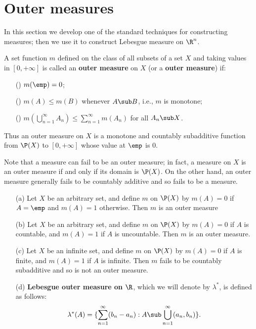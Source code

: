 \section{Outer measures}
In this section we develop one of the standard techniques for constructing measures; then we use it to construct Lebesgue measure on $\R^n$.
\begin{definition}
A set function $m$ defined on the class of all subsets of a set $X$ and taking values in $[0,+\infty]$ is called an \textbf{outer measure} on $X$ (or a \textbf{outer measure}) if:
\begin{itemize}
\item[(\rmnum{1})] $m(\emp)=0$;
\item[(\rmnum{2})] $m(A)\leq m(B)$ whenever $A\sub B$, i.e., $m$ is monotone;
\item[(\rmnum{3})] $m(\bigcup_{n=1}^{\infty}A_n)\leq\sum_{n=1}^{\infty}m(A_n)$ for all $A_n\sub X$.
\end{itemize}
\end{definition}
Thus an outer measure on $X$ is a monotone and countably subadditive function from $\P(X)$ to $[0,+\infty]$ whose value at $\emp$ is $0$.\par
Note that a measure can fail to be an outer measure; in fact, a measure on $X$ is an outer measure if and only if its domain is $\P(X)$. On the other hand, an outer measure generally fails to be countably additive and so fails to be a measure.
\begin{example}
\mbox{}
\begin{itemize}
\item[(a)] Let $X$ be an arbitrary set, and define $m$ on $\P(X)$ by $m(A)=0$ if $A=\emp$ and $m(A)=1$ otherwise. Then $m$ is an outer measure
\item[(b)] Let $X$ be an arbitrary set, and define $m$ on $\P(X)$ by $m(A)=0$ if $A$ is countable, and $m(A)=1$ if $A$ is uncountable. Then $m$ is an outer measure.
\item[(c)] Let $X$ be an infinite set, and define $m$ on $\P(X)$ by $m(A)=0$ if $A$ is finite, and $m(A)=1$ if $A$ is infinite. Then $m$ fails to be countably subadditive and so is not an outer measure.
\item[(d)] \textbf{Lebesgue outer measure on $\R$}, which we will denote by $\lambda^*$, is defined as follows:
\[\lambda^*(A)=\{\sum_{n=1}^{\infty}(b_n-a_n):A\sub\bigcup_{n=1}^{\infty}(a_n,b_n)\}.\]
\end{itemize}
\end{example}
